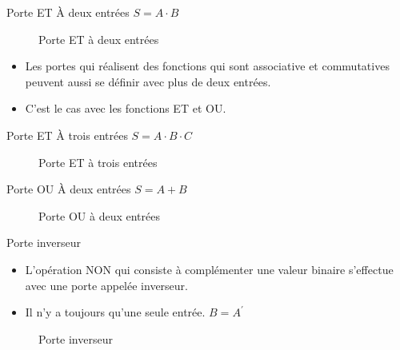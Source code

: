 \documentclass[presentation]{beamer}
\begin{document}
\begin{frame}[label={sec:orgb7e3e0f}]{Porte ET}
À deux entrées \(S =  A \cdot B\)

\begin{figure}[htbp]
\centering

\caption{\label{fig:orgb438901}Porte ET à deux entrées}
\end{figure}

\begin{itemize}
\item Les portes qui réalisent des fonctions qui sont associative et commutatives peuvent aussi se définir avec plus de deux entrées.

\item C'est le cas avec les fonctions ET et OU.
\end{itemize}
\end{frame}

\begin{frame}[label={sec:org03acbab}]{Porte ET}
À trois entrées \(S =  A \cdot B \cdot C\)

\begin{figure}[htbp]
\centering

\caption{\label{fig:org93af38e}Porte ET à trois entrées}
\end{figure}
\end{frame}

\begin{frame}[label={sec:orgbdd3d16}]{Porte OU}
À deux entrées \(S =  A + B\)

\begin{figure}[htbp]
\centering

\caption{\label{fig:org6446c41}Porte OU à deux entrées}
\end{figure}
\end{frame}

\begin{frame}[label={sec:org13d7c41}]{Porte inverseur}
\begin{itemize}
\item L'opération NON qui consiste à complémenter une valeur binaire s'effectue avec une porte appelée \alert{inverseur}.

\item Il n'y a toujours qu'une seule entrée. \(B = A^\prime\)
\end{itemize}

\begin{figure}[htbp]
\centering

\caption{\label{fig:orge9be5d8}Porte inverseur}
\end{figure} 
\end{frame}
\end{document}
